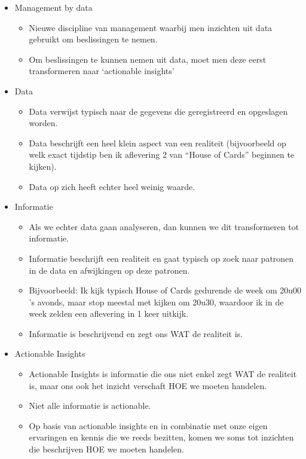 \documentclass[]{memoir}
\providecommand{\tightlist}{%
  \setlength{\itemsep}{0pt}\setlength{\parskip}{0pt}}
\begin{document}
\begin{itemize}
\tightlist
\item
  Management by data

  \begin{itemize}
  \tightlist
  \item
    Nieuwe discipline van management waarbij men inzichten uit data
    gebruikt om beslissingen te nemen.
  \item
    Om beslissingen te kunnen nemen uit data, moet men deze eerst
    transformeren naar `actionable insights'
  \end{itemize}
\item
  Data

  \begin{itemize}
  \tightlist
  \item
    Data verwijst typisch naar de gegevens die geregistreerd en
    opgeslagen worden.
  \item
    Data beschrijft een heel klein aspect van een realiteit
    (bijvoorbeeld op welk exact tijdstip ben ik aflevering 2 van ``House
    of Cards'' beginnen te kijken).
  \item
    Data op zich heeft echter heel weinig waarde.
  \end{itemize}
\item
  Informatie

  \begin{itemize}
  \tightlist
  \item
    Als we echter data gaan analyseren, dan kunnen we dit transformeren
    tot informatie.
  \item
    Informatie beschrijft een realiteit en gaat typisch op zoek naar
    patronen in de data en afwijkingen op deze patronen.
  \item
    Bijvoorbeeld: Ik kijk typisch House of Cards gedurende de week om
    20u00 's avonds, maar stop meestal met kijken om 20u30, waardoor ik
    in de week zelden een aflevering in 1 keer uitkijk.
  \item
    Informatie is beschrijvend en zegt ons WAT de realiteit is.
  \end{itemize}
\item
  Actionable Insights

  \begin{itemize}
  \tightlist
  \item
    Actionable Insights is informatie die ons niet enkel zegt WAT de
    realiteit is, maar ons ook het inzicht verschaft HOE we moeten
    handelen.
  \item
    Niet alle informatie is actionable.
  \item
    Op basis van actionable insights en in combinatie met onze eigen
    ervaringen en kennis die we reeds bezitten, komen we soms tot
    inzichten die beschrijven HOE we moeten handelen.
  \end{itemize}
\end{itemize}
\end{document}
